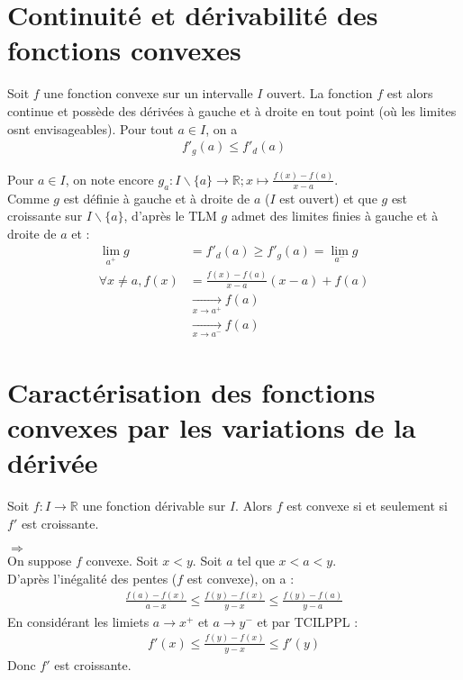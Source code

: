 \documentclass[../main.tex]{subfiles}
\begin{document}
\section{Continuité et dérivabilité des fonctions convexes}
\begin{tcolorbox}[title=Théorème 19.9, title filled=false, colframe=orange, colback=orange!10!white]
    Soit $f$ une fonction convexe sur un intervalle $I$ ouvert. La fonction $f$ est alors continue et possède des dérivées à gauche et à droite en tout point (où les limites osnt envisageables). Pour tout $a \in I$, on a
    \begin{align*}
        f'_g(a) \leq f'_d(a)
    \end{align*}
\end{tcolorbox}

\noindent Pour $a \in I$, on note encore $g_a:I\backslash\{a\}\to \mathbb{R}; x\mapsto \frac{f(x) - f(a)}{x - a}$. \\
Comme $g$ est définie à gauche et à droite de $a$ ($I$ est ouvert) et que $g$ est croissante sur $I\backslash\{a\}$, d'après le TLM $g$ admet des limites finies à gauche et à droite de $a$ et : 
\begin{align*}
    \lim_{a^+} g &= f'_d(a) \geq f'_g(a) = \lim_{a^-} g \\
    \forall x \neq a, f(x) &= \frac{f(x) - f(a)}{x-a}(x-a) + f(a) \\
    &\underset{x \to a^+}{\longrightarrow} f(a) \\
    &\underset{x \to a^-}{\longrightarrow} f(a)
\end{align*}

\section{Caractérisation des fonctions convexes par les variations de la dérivée}
\begin{tcolorbox}[title=Théorème 19.11, title filled=false, colframe=orange, colback=orange!10!white]
    Soit $f:I\to \mathbb{R}$ une fonction dérivable sur $I$. Alors $f$ est convexe si et seulement si $f'$ est croissante. 
\end{tcolorbox}

$\boxed{\Rightarrow}$ \\
On suppose $f$ convexe. Soit $x < y$. Soit $a$ tel que $x < a < y$. \\
D'après l'inégalité des pentes ($f$ est convexe), on a : 
\begin{align*}
    \frac{f(a) - f(x)}{a-x} \leq \frac{f(y) - f(x)}{y-x} \leq \frac{f(y) - f(a)}{y-a}
\end{align*}
En considérant les limiets $a\to x^+$ et $a\to y^-$ et par TCILPPL : 
\begin{align*}
    f'(x) \leq \frac{f(y) - f(x)}{y-x} \leq f'(y)
\end{align*}
Donc $f'$ est croissante. \\
\end{document}

